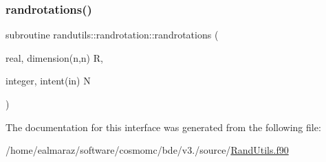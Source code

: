 \subsubsection{\texorpdfstring{randrotations()}{randrotations()}}
{\footnotesize\ttfamily subroutine randutils\+::randrotation\+::randrotations (\begin{DoxyParamCaption}\item[{real, dimension(n,n)}]{R,  }\item[{integer, intent(in)}]{N }\end{DoxyParamCaption})}



The documentation for this interface was generated from the following file\+:\begin{DoxyCompactItemize}
\item 
/home/ealmaraz/software/cosmomc/bde/v3./source/\mbox{\hyperlink{RandUtils_8f90}{Rand\+Utils.\+f90}}\end{DoxyCompactItemize}
